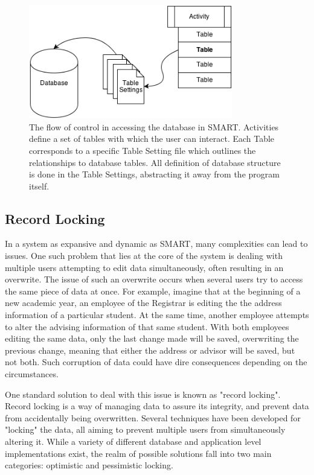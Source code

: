 \documentclass[12pt]{article}
\begin{document}
\begin{figure}[h]
    \vspace{10pt}
    \begin{center}
        \centerline{\includegraphics[width=3.5in]{diagrams/SMARTAccess.png}}
    \end{center}
    \begin{spacing}{1.0}\caption{The flow of control in accessing the database in SMART. Activities define a set of tables with which the user can interact. Each Table corresponds to a specific Table Setting file which outlines the relationships to database tables. All definition of database structure is done in the Table Settings, abstracting it away from the program itself.}\end{spacing}
\end{figure}

\subsection{Record Locking}

In a system as expansive and dynamic as SMART, many complexities can lead to issues. One such problem that lies at the core of the system is dealing with multiple users attempting to edit data simultaneously, often resulting in an overwrite. The issue of such an overwrite occurs when several users try to access the same piece of data at once. For example, imagine that at the beginning of a new academic year, an employee of the Registrar is editing the the address information of a particular student. At the same time, another employee attempts to alter the advising information of that same student. With both employees editing the same data, only the last change made will be saved, overwriting the previous change, meaning that either the address or advisor will be saved, but not both. Such corruption of data could have dire consequences depending on the circumstances.  

One standard solution to deal with this issue is known as "record locking". Record locking is a way of managing data to assure its integrity, and prevent data from accidentally being overwritten. Several techniques have been developed for "locking" the data, all aiming to prevent multiple users from simultaneously altering it. While a variety of different database and application level implementations exist, the realm of possible solutions fall into two main categories: optimistic and pessimistic locking. 
\end{document}
